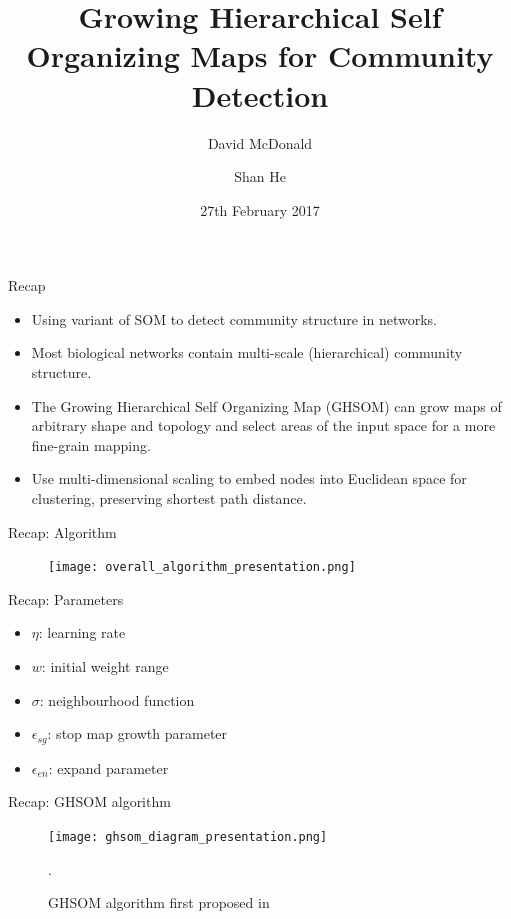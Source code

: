 \documentclass{beamer}
\title[GHSOM for Community Detection]{Growing Hierarchical Self Organizing Maps for Community Detection}
\author{David McDonald \and Shan He}
\institute{University of Birmingham, \\ Birmingham, UK \\ B15 2TT}
\date{27th February 2017}
\begin{document}
	
	\begin{frame}
		\titlepage
	\end{frame}

	\begin{frame}{Recap}
		\begin{itemize}
			\item Using variant of SOM to detect community structure in networks.
			\item Most biological networks contain multi-scale (hierarchical) community structure.
			\item The Growing Hierarchical Self Organizing Map (GHSOM) can grow maps of arbitrary shape and topology and select areas of the input space for a more fine-grain mapping.
			\item Use multi-dimensional scaling to embed nodes into Euclidean space for clustering, preserving shortest path distance.
		\end{itemize}
	\end{frame}
	
	\begin{frame}{Recap: Algorithm}
			\begin{figure}
			\centering
			\texttt{[image: overall\_algorithm\_presentation.png]}
		\end{figure}
	\end{frame}
	
		\begin{frame}{Recap: Parameters}
		\begin{itemize}
		\item $\eta$: learning rate
				\item $w$: initial weight range
		\item $\sigma$: neighbourhood function
		\item $\epsilon_{sg}$: stop map growth parameter
		\item $\epsilon_{en}$: expand parameter
		\end{itemize}			
	\end{frame}
	
	\begin{frame}{Recap: GHSOM algorithm}
		\begin{figure}
			\centering
			\texttt{[image: ghsom\_diagram\_presentation.png]}
			\caption{GHSOM algorithm first proposed in \protect\cite{dittenbach2000growing}}.
		\end{figure}
	\end{frame}
	
\end{document}
